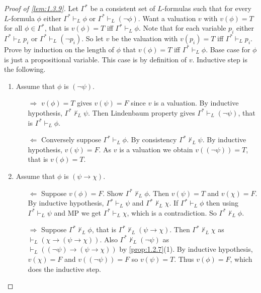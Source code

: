 \documentclass{article}
\newcommand{\rb}[1]{\left( #1 \right)}
\newcommand{\notb}[1]{\rb{\neg #1}}
\newcommand{\impb}[2]{\rb{#1 \rightarrow #2}}
\theoremstyle{definition}\newtheorem{definition}{Definition}[subsection]
\theoremstyle{definition}\newtheorem{remark}[definition]{Remark}
\theoremstyle{definition}\newtheorem*{example}{Example}
\theoremstyle{definition}\newtheorem*{note}{Note}
\begin{document}
\begin{proof}[Proof of \ref{lem:1.3.9}]
Let $ \Gamma^* $ be a consistent set of $ L $-formulas such that for every $ L $-formula $ \phi $ either $ \Gamma^* \vdash_L \phi $ or $ \Gamma^* \vdash_L \notb{\phi} $. Want a valuation $ v $ with $ v\rb{\phi} = T $ for all $ \phi \in \Gamma^* $, that is $ v\rb{\phi} = T $ iff $ \Gamma^* \vdash_L \phi $. Note that for each variable $ p_i $ either $ \Gamma^* \vdash_L p_i $ or $ \Gamma^* \vdash_L \notb{p_i} $. So let $ v $ be the valuation with $ v\rb{p_i} = T $ iff $ \Gamma^* \vdash_L p_i $. Prove by induction on the length of $ \phi $ that $ v\rb{\phi} = T $ iff $ \Gamma^* \vdash_L \phi $. Base case for $ \phi $ is just a propositional variable. This case is by definition of $ v $. Inductive step is the following.
\begin{enumerate}
\item Assume that $ \phi $ is $ \notb{\psi} $.
\begin{itemize}
\item[$ \Rightarrow $] $ v\rb{\phi} = T $ gives $ v\rb{\psi} = F $ since $ v $ is a valuation. By inductive hypothesis, $ \Gamma^* \not\vdash_L \psi $. Then Lindenbaum property gives $ \Gamma^* \vdash_L \notb{\psi} $, that is $ \Gamma^* \vdash_L \phi $.
\item[$ \Leftarrow $] Conversely suppose $ \Gamma^* \vdash_L \phi $. By consistency $ \Gamma^* \not\vdash_L \psi $. By inductive hypothesis, $ v\rb{\psi} = F $. As $ v $ is a valuation we obtain $ v\rb{\notb{\psi}} = T $, that is $ v\rb{\phi} = T $.
\end{itemize}
\item Assume that $ \phi $ is $ \impb{\psi}{\chi} $.
\begin{itemize}
\item[$ \Leftarrow $] Suppose $ v\rb{\phi} = F $. Show $ \Gamma^* \not\vdash_L \phi $. Then $ v\rb{\psi} = T $ and $ v\rb{\chi} = F $. By inductive hypothesis, $ \Gamma^* \vdash_L \psi $ and $ \Gamma^* \not\vdash_L \chi $. If $ \Gamma^* \vdash_L \phi $ then using $ \Gamma^* \vdash_L \psi $ and MP we get $ \Gamma^* \vdash_L \chi $, which is a contradiction. So $ \Gamma^* \not\vdash_L \phi $.
\item[$ \Rightarrow $] Suppose $ \Gamma^* \not\vdash_L \phi $, that is $ \Gamma^* \not\vdash_L \impb{\psi}{\chi} $. Then $ \Gamma^* \not\vdash_L \chi $ as $ \vdash_L \impb{\chi}{\impb{\psi}{\chi}} $. Also $ \Gamma^* \not\vdash_L \notb{\psi} $ as $ \vdash_L \impb{\notb{\psi}}{\impb{\psi}{\chi}} $ by \ref{prop:1.2.7}(1). By inductive hypothesis, $ v\rb{\chi} = F $ and $ v\rb{\notb{\psi}} = F $ so $ v\rb{\psi} = T $. Thus $ v\rb{\phi} = F $, which does the inductive step.
\end{itemize}
\end{enumerate}
\end{proof}
\end{document}
